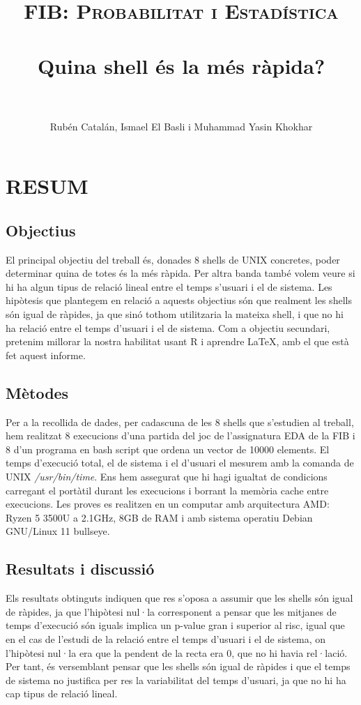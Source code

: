 \documentclass[12pt]{article}
\title{
  \normalfont \normalsize 
  \textsc{FIB: Probabilitat i Estadística} \\ [25pt] 
  \horrule{0.5pt} \\[0.4cm] %
  \huge Quina shell és la més ràpida? \\ %
  \horrule{2pt} \\[0.5cm] %
}
\author{Rubén Catalán, Ismael El Basli i Muhammad Yasin Khokhar}
\begin{document}
\maketitle %

\newpage
\section*{RESUM}
\subsection*{Objectius}
El principal objectiu del treball és, donades 8 shells de UNIX concretes, poder determinar quina de totes
és la més ràpida. Per altra banda també volem veure si hi ha algun tipus de relació lineal entre el temps s'usuari
i el de sistema. Les hipòtesis que plantegem en relació a aquests objectius són que realment les shells són igual
de ràpides, ja que sinó tothom utilitzaria la mateixa shell, i que no hi ha relació entre el temps d'usuari i el de sistema.
Com a objectiu secundari, pretenim millorar la nostra habilitat usant R i aprendre \LaTeX, amb el que està fet aquest informe.
\subsection*{Mètodes}
Per a la recollida de dades, per cadascuna de les 8 shells que s'estudien al treball, hem realitzat 8 execucions d'una partida
del joc de l'assignatura EDA de la FIB i 8 d'un programa en bash script que ordena un vector de 10000 elements. El temps d'execució total,
el de sistema i el d'usuari el mesurem amb la comanda de UNIX \emph{/usr/bin/time}.
Ens hem assegurat que hi hagi igualtat de condicions carregant el portàtil durant les execucions i borrant la memòria cache entre execucions. Les proves
es realitzen en un computar amb arquitectura AMD: Ryzen 5 3500U a 2.1GHz, 8GB de RAM i amb sistema operatiu Debian GNU/Linux 11 bullseye.

\subsection*{Resultats i discussió}
Els resultats obtinguts indiquen que res s'oposa a assumir que les shells són igual de ràpides, ja que l'hipòtesi nul·la corresponent
a pensar que les mitjanes de temps d'execució són iguals implica un p-value gran i superior al risc, igual que en el cas de l'estudi de la relació entre el temps
d'usuari i el de sistema, on l'hipòtesi nul·la era que la pendent de la recta era 0, que no hi havia rel·lació. Per tant, és versemblant 
pensar que les shells són igual de ràpides i que el temps de sistema no justifica per res la variabilitat del temps d'usuari, ja que no
hi ha cap tipus de relació lineal.
\end{document}
